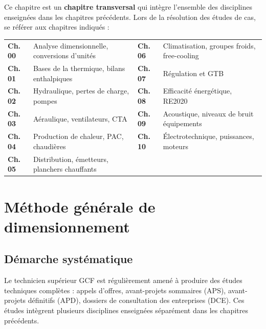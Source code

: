 \begin{tcolorbox}[
  enhanced, colback=FedBlue!4, colframe=FedBlue!45,
  fonttitle=\bfseries\sffamily, coltitle=FedBlue,
  title={Chapitres du cours mobilisés dans ce chapitre de synthèse},
  boxrule=0.7pt, arc=2pt, width=\textwidth
]
\small\sffamily
Ce chapitre est un \textbf{chapitre transversal} qui intègre l'ensemble des disciplines
enseignées dans les chapitres précédents. Lors de la résolution des études de cas, se
référer aux chapitres indiqués :

\begin{tabular}{@{}ll@{\quad}ll@{}}
  \textbf{Ch.\,00} & Analyse dimensionnelle, conversions d'unités &
  \textbf{Ch.\,06} & Climatisation, groupes froids, free-cooling \\
  \textbf{Ch.\,01} & Bases de la thermique, bilans enthalpiques &
  \textbf{Ch.\,07} & Régulation et GTB \\
  \textbf{Ch.\,02} & Hydraulique, pertes de charge, pompes &
  \textbf{Ch.\,08} & Efficacité énergétique, RE2020 \\
  \textbf{Ch.\,03} & Aéraulique, ventilateurs, CTA &
  \textbf{Ch.\,09} & Acoustique, niveaux de bruit équipements \\
  \textbf{Ch.\,04} & Production de chaleur, PAC, chaudières &
  \textbf{Ch.\,10} & Électrotechnique, puissances, moteurs \\
  \textbf{Ch.\,05} & Distribution, émetteurs, planchers chauffants & & \\
\end{tabular}
\end{tcolorbox}

\section{Méthode générale de dimensionnement}

\subsection{Démarche systématique}

Le technicien supérieur GCF est régulièrement amené à produire des études techniques complètes : appels d'offres, avant-projets sommaires (APS), avant-projets définitifs (APD), dossiers de consultation des entreprises (DCE). Ces études intègrent plusieurs disciplines enseignées séparément dans les chapitres précédents.

